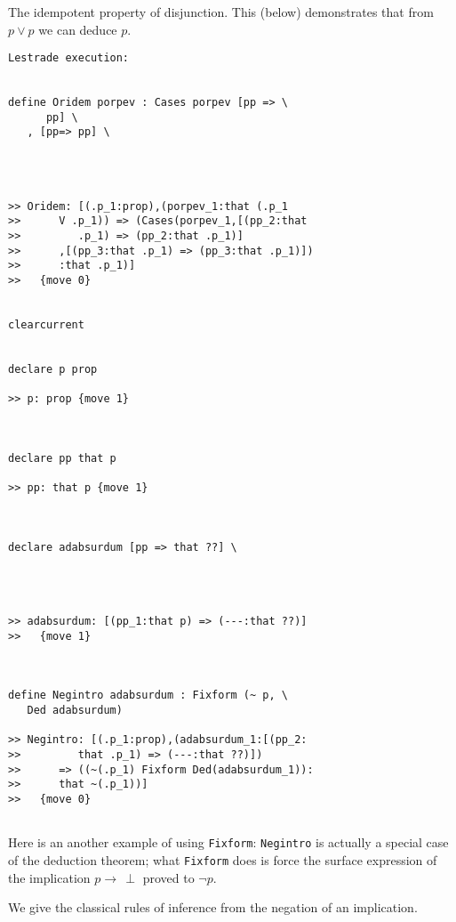 \documentclass[12pt]{article}
\begin{document}
The idempotent property of disjunction.  This (below) demonstrates that from $p \vee p$ we can deduce $p$.

\begin{verbatim}Lestrade execution:


define Oridem porpev : Cases porpev [pp => \
      pp] \
   , [pp=> pp] \
   



>> Oridem: [(.p_1:prop),(porpev_1:that (.p_1
>>      V .p_1)) => (Cases(porpev_1,[(pp_2:that
>>         .p_1) => (pp_2:that .p_1)]
>>      ,[(pp_3:that .p_1) => (pp_3:that .p_1)])
>>      :that .p_1)]
>>   {move 0}


clearcurrent


declare p prop

>> p: prop {move 1}



declare pp that p

>> pp: that p {move 1}



declare adabsurdum [pp => that ??] \
   



>> adabsurdum: [(pp_1:that p) => (---:that ??)]
>>   {move 1}



define Negintro adabsurdum : Fixform (~ p, \
   Ded adabsurdum)

>> Negintro: [(.p_1:prop),(adabsurdum_1:[(pp_2:
>>         that .p_1) => (---:that ??)])
>>      => ((~(.p_1) Fixform Ded(adabsurdum_1)):
>>      that ~(.p_1))]
>>   {move 0}


\end{verbatim}


Here is an another example of using {\tt Fixform}:  {\tt Negintro} is actually a special case of the deduction theorem;  what {\tt Fixform} does is force the surface expression of the implication
$p \rightarrow \, \perp$ proved to $\neg p$.

We give the classical rules of inference from the negation of an implication.
\end{document}
